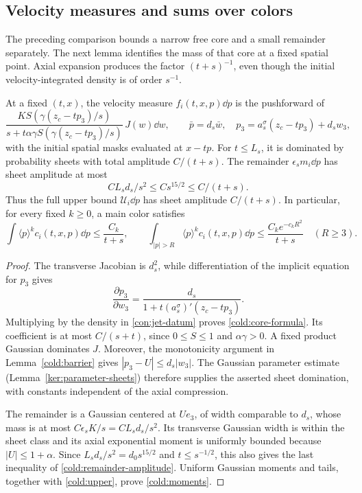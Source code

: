 \subsection{Velocity measures and sums over colors}

The preceding comparison bounds a narrow free core and a small
remainder separately.  The next lemma identifies the mass of that
core at a fixed spatial point.  Axial expansion produces the factor
\((t+s)^{-1}\), even though the initial velocity-integrated density is of order \(s^{-1}\).

\begin{lemma}\label{cold:core-amplitude}
At a fixed \((t,x)\), the velocity measure \(f_i(t,x,p)\dd p\) is the
pushforward of
\begin{equation}
 \frac{K S(\gamma(z_c-tp_3)/s)}
          {s+t\alpha\gamma S(\gamma(z_c-tp_3)/s)}\,J(w)\dd w,\qquad
 \bar p=d_s\bar w,\quad
 p_3=a_s^\sigma(z_c-tp_3)+d_sw_3,
 \label{cold:core-formula}
\end{equation}
with the initial spatial masks evaluated at \(x-tp\).
For \(t\le L_s\), it is dominated by probability sheets with total
amplitude \(C/(t+s)\).  The remainder
\(\epsilon_s m_i\dd p\) has sheet amplitude at most
\begin{equation}
 C L_sd_s/s^2\le Cs^{15/2}\le C/(t+s).
 \label{cold:remainder-amplitude}
\end{equation}
Thus the full upper bound \(\mathcal U_i\dd p\) has sheet amplitude \(C/(t+s)\).
In particular, for every fixed \(k\ge0\), a main color satisfies
\begin{equation}
 \int\langle p\rangle^k c_i(t,x,p)\dd p\le\frac{C_k}{t+s},\qquad
 \int_{|p|>R}\langle p\rangle^k c_i(t,x,p)\dd p
       \le\frac{C_k e^{-c_kR^2}}{t+s}\quad(R\ge3).
 \label{cold:moments}
\end{equation}
\end{lemma}
\begin{proof}
The transverse Jacobian is \(d_s^2\), while differentiation of the
implicit equation for \(p_3\) gives
\[
 \frac{\partial p_3}{\partial w_3}
 =\frac{d_s}{1+t(a_s^\sigma)'(z_c-tp_3)}.
\]
Multiplying by the density in \eqref{con:jet-datum} proves
\eqref{cold:core-formula}.  Its coefficient is at most
\(C/(s+t)\), since \(0\le S\le1\) and \(\alpha\gamma>0\).
A fixed product Gaussian dominates \(J\).  Moreover, the monotonicity
argument in Lemma~\ref{cold:barrier} gives
\(|p_3-U|\le d_s|w_3|\).  The Gaussian parameter estimate
(Lemma~\ref{ker:parameter-sheets}) therefore supplies the asserted
sheet domination, with constants independent of the axial compression.

The remainder is a Gaussian centered at \(Ue_3\), of width comparable
to \(d_s\), whose mass is at most
\(C\epsilon_s K/s=C L_sd_s/s^2\).  Its transverse Gaussian width is
within the sheet class and its axial exponential moment is uniformly
bounded because \(|U|\le1+\alpha\).  Since
\(L_sd_s/s^2=d_0s^{15/2}\) and \(t\le s^{-1/2}\), this also gives the
last inequality of \eqref{cold:remainder-amplitude}.  Uniform Gaussian
moments and tails, together with \eqref{cold:upper}, prove
\eqref{cold:moments}.
\end{proof}

